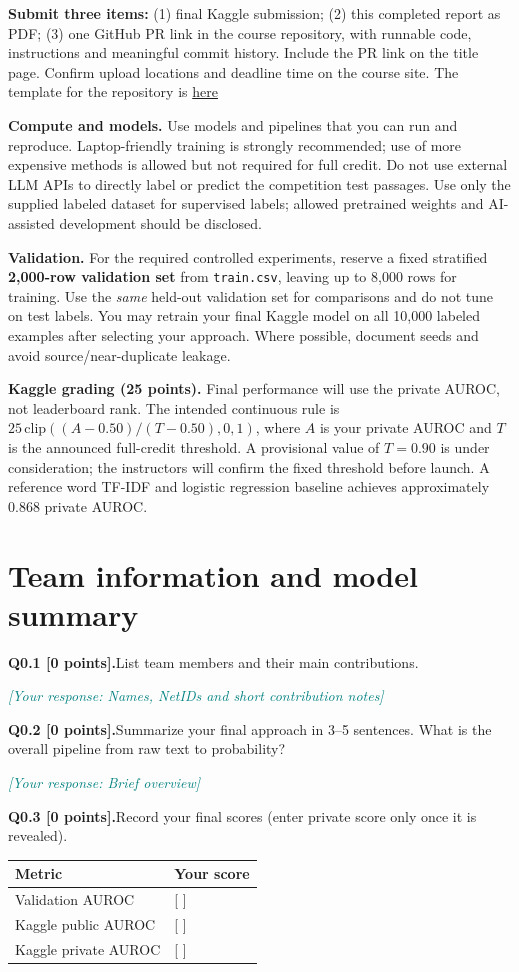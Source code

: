\documentclass[11pt,letterpaper]{article}
\newcommand{\placeholder}[1]{\par\noindent\textcolor{teal}{\textit{[Your response: #1]}}\par\vspace{0.3em}}
\newcommand{\question}[2]{\needspace{4\baselineskip}\par\addvspace{0.45em}\noindent\textbf{#1}\quad #2\par\nobreak\vspace{0.1em}}
\begin{document}
\textbf{Submit three items:} (1) final Kaggle submission; (2) this completed report as PDF; (3) one GitHub PR link in the course repository, with runnable code, instructions and meaningful commit history. Include the PR link on the title page. Confirm upload locations and deadline time on the course site. The template for the repository is \href{https://github.com/sekhari/human-or-ai-submissions}{here}

\textbf{Compute and models.} Use models and pipelines that you can run and reproduce. Laptop-friendly training is strongly recommended; use of more expensive methods is allowed but not required for full credit. Do not use external LLM APIs to directly label or predict the competition test passages. Use only the supplied labeled dataset for supervised labels; allowed pretrained weights and AI-assisted development should be disclosed.

\textbf{Validation.} For the required controlled experiments, reserve a fixed stratified \textbf{2,000-row validation set} from \texttt{train.csv}, leaving up to 8,000 rows for training. Use the \emph{same} held-out validation set for comparisons and do not tune on test labels. You may retrain your final Kaggle model on all 10,000 labeled examples after selecting your approach. Where possible, document seeds and avoid source/near-duplicate leakage.

\textbf{Kaggle grading (25 points).} Final performance will use the private AUROC, not leaderboard rank. The intended continuous rule is $25\,\mathrm{clip}((A-0.50)/(T-0.50),0,1)$, where $A$ is your private AUROC and $T$ is the announced full-credit threshold. A provisional value of $T=0.90$ is under consideration; the instructors will confirm the fixed threshold before launch. A reference word TF-IDF and logistic regression baseline achieves approximately 0.868 private AUROC.

\section{Team information and model summary}
\question{Q0.1 [0 points].}{List team members and their main contributions.}
\placeholder{Names, NetIDs and short contribution notes}
\question{Q0.2 [0 points].}{Summarize your final approach in 3--5 sentences. What is the overall pipeline from raw text to probability?}
\placeholder{Brief overview}
\question{Q0.3 [0 points].}{Record your final scores (enter private score only once it is revealed).}
\begin{tabularx}{\linewidth}{@{}Yp{1.8in}@{}}\toprule Metric & Your score \\ \midrule Validation AUROC & [ ] \\ Kaggle public AUROC & [ ] \\ Kaggle private AUROC & [ ] \\ \bottomrule\end{tabularx}
\end{document}
